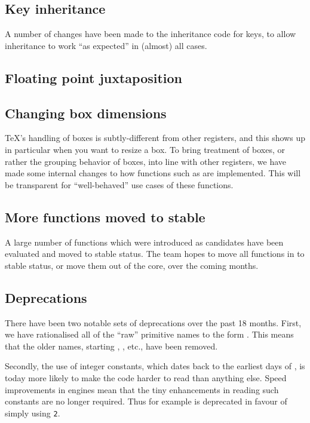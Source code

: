 \documentclass{ltnews}
\begin{document}
\subsection{Key inheritance}

A number of changes have been made to the inheritance code for keys,
to allow inheritance to work \enquote{as expected} in (almost) all
cases.

\subsection{Floating point juxtaposition}


\subsection{Changing box dimensions}

\TeX{}'s handling of boxes is subtly-different from other registers, and this
shows up in particular when you want to resize a box. To bring treatment of
boxes, or rather the grouping behavior of boxes, into line with other
registers, we have made some internal changes to how functions such as
 are implemented. This will be transparent for
\enquote{well-behaved} use cases of these functions.

\subsection{More functions moved to stable}

A large number of functions which were introduced as candidates have been
evaluated and moved to stable status. The team hopes to move all functions
in  to stable status, or move them out of the core, over the coming
months.

\subsection{Deprecations}

There have been two notable sets of deprecations over the past 18 months.
First, we have rationalised all of the \enquote{raw} primitive names to the
form . This means that the older names, starting
, , etc., have been removed.

Secondly, the use of integer constants, which dates back to the earliest days
of , is today more likely to make the code harder to read than
anything else. Speed improvements in engines mean that the tiny enhancements in
reading such constants are no longer required. Thus for example  is
deprecated in favour of simply using \texttt{2}.
\end{document}
